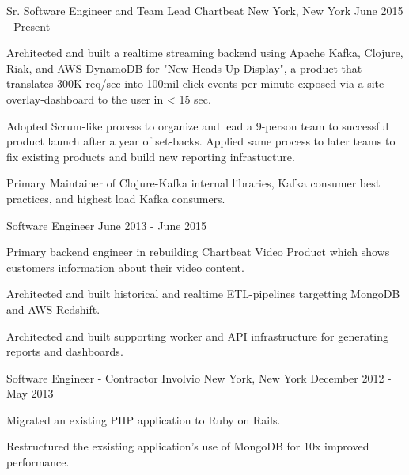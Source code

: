 
\begin{cventries}

	\cventry
	{Sr. Software Engineer and Team Lead}
	{Chartbeat}
	{New York, New York}
	{June 2015 - Present}
	{
		\begin{cvitems}
		\item {Architected and built a realtime streaming backend using Apache Kafka, Clojure, Riak, and AWS DynamoDB for "New Heads Up Display", a product that translates 300K req/sec into 100mil click events per minute exposed via a site-overlay-dashboard to the user in < 15 sec.}
		\item {Adopted Scrum-like process to organize and lead a 9-person team to successful product launch after a year of set-backs. Applied same process to later teams to fix existing products and build new reporting infrastucture.}
		\item {Primary Maintainer of Clojure-Kafka internal libraries, Kafka consumer best practices, and highest load Kafka consumers.}
		\end{cvitems}
	}


	\cventry
	{Software Engineer}
	{}
	{}
	{June 2013 - June 2015}
	{
		\begin{cvitems}
		\item {Primary backend engineer in rebuilding Chartbeat Video Product which shows customers information about their video content.}
		\item {Architected and built historical and realtime ETL-pipelines targetting MongoDB and AWS Redshift.}
		\item {Architected and built supporting worker and API infrastructure for generating reports and dashboards.}
		\end{cvitems}
	}


	\cventry
	{Software Engineer - Contractor}
	{Involvio}
	{New York, New York}
	{December 2012 - May 2013}
	{
		\begin{cvitems}
		\item {Migrated an existing PHP application to Ruby on Rails.}
		\item {Restructured the exsisting application's use of MongoDB for 10x improved performance.}
		\end{cvitems}
	}


\end{cventries}
